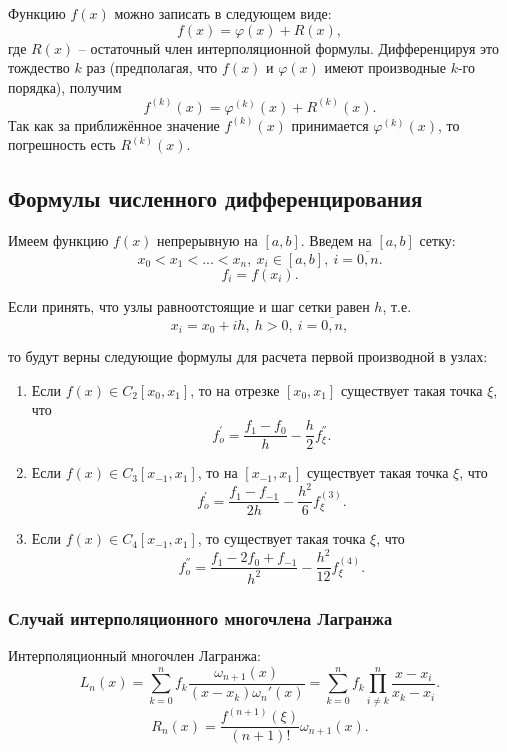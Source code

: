 \documentclass[
11pt,
master, %
subf, %
href, %
colorlinks=true, %
times, %
]{disser}
\begin{document}
Функцию $f(x)$ можно записать в следующем виде:
$$f(x) = \varphi(x) + R(x),$$
где $R(x)$ -- остаточный член интерполяционной формулы. Дифференцируя это тождество $k$ раз (предполагая, что $f(x)$ и $\varphi(x)$ имеют производные $k$-го порядка), получим
$$f^{(k)}(x) = \varphi^{(k)}(x) + R^{(k)}(x).$$
Так как за приближённое значение $f^{(k)}(x)$ принимается $\varphi^{(k)}(x)$, то погрешность есть $R^{(k)}(x)$.

\subsection{Формулы численного дифференцирования}
Имеем функцию $f(x)$ непрерывную на $[a,b]$. Введем на $[a,b]$ сетку:
$$x_0<x_1<...<x_n, ~ x_i\in[a,b], ~ i=\overline{0,n}.$$
$$f_i = f(x_i).$$

Если принять, что узлы равноотстоящие и шаг сетки равен $h$, т.е.
\begin{equation}
x_i=x_0 + ih, ~ h>0, ~ i=\overline{0,n},
\end{equation}

то будут верны следующие формулы для расчета первой производной в узлах:
\begin{enumerate}
\item Если $f(x) \in C_2 [x_0, x_1]$, то на отрезке $[x_0,x_1]$ существует такая точка $\xi$, что
\begin{equation}
f_o^{'}=\frac{f_1-f_0}{h}-\frac{h}{2}f^{''}_{\xi}.
\end{equation}

\item Если  $f(x) \in C_3 [x_{-1}, x_1]$, то на $[x_{-1}, x_1]$ существует такая точка $\xi$, что
\begin{equation}
f_o^{'}=\frac{f_{1}-f_{-1}}{2h}-\frac{h^2}{6}f^{(3)}_{\xi}.
\end{equation}


\item Если $f(x) \in C_4 [x_{-1}, x_1]$, то существует такая точка $\xi$, что
\begin{equation}
f_o^{''}=\frac{f_{1}-2f_0+f_{-1}}{h^2}-\frac{h^2}{12}f^{(4)}_{\xi}.
\end{equation}
\end{enumerate}


\subsubsection{Случай интерполяционного многочлена Лагранжа}
Интерполяционный многочлен Лагранжа:
$$L_n(x) = \sum_{k=0}^{n}f_k\frac{\omega_{n+1}(x)}{(x-x_k)\omega_n'(x)} = \sum_{k=0}^{n}f_k\prod_{i\neq k}^{n}\frac{x-x_i}{x_k-x_i}.$$
$$R_n(x) = \frac{f^{(n+1)}(\xi)}{(n+1)!}\omega_{n+1}(x).$$
\end{document}
